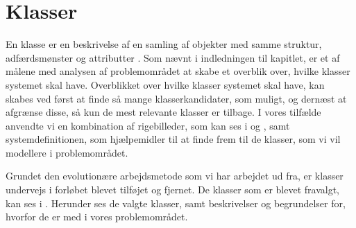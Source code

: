 \section{Klasser}
\label{sec:klasser}

En klasse er en beskrivelse af en samling af objekter med samme struktur, adfærdsmønster og attributter \cite[s. ~51]{ooad}. Som nævnt i indledningen til kapitlet, er et af målene med analysen af problemområdet at skabe et overblik over, hvilke klasser systemet skal have. Overblikket over hvilke klasser systemet skal have, kan skabes ved først at finde så mange klasserkandidater, som muligt, og dernæst at afgrænse disse, så kun de mest relevante klasser er tilbage. I vores tilfælde anvendte vi en kombination af rigebilleder, som kan ses i  og , samt systemdefinitionen, som hjælpemidler til at finde frem til de klasser, som vi vil modellere i problemområdet.

Grundet den evolutionære arbejdsmetode som vi har arbejdet ud fra, er klasser undervejs i forløbet blevet tilføjet og fjernet. De klasser som er blevet fravalgt, kan ses i . Herunder ses de valgte klasser, samt beskrivelser og begrundelser for, hvorfor de er med i vores problemområdet. 

